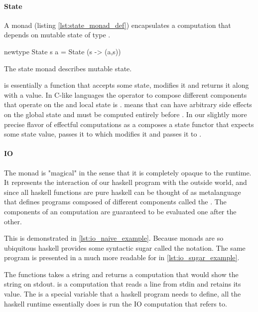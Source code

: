 \paragraph{State}

A  monad (listing \ref{lst:state_monad_def}) encapsulates
a computation that depends on mutable state of type .

\begin{code}
\begin{haskellcode}
newtype State s a = State (s -> (a,s))
\end{haskellcode}

  \caption{\label{lst:state_monad_def}The state monad describes
    mutable state.}
\end{code}

 is essentially a function that accepts some state, modifies it
and returns it along with a value. In C-like languages the operator to
compose different components that operate on the and local state is
\cpp{;}.  means that  can have arbitrary side effects on
the global state and must be computed entirely before . In our
slightly more precise flavor of effectful computations  as a
 composes a state functor that expects some state value, passes
it to  which modifies it and passes it to .

\paragraph{IO}

The  monad is "magical" in the sense that it is completely
opaque to the runtime. It represents the interaction of our haskell
program with the outside world, and since all haskell functions are
pure haskell can be thought of as metalanguage that defines programs
composed of different  components called the . The components of an  computation are guaranteed to
be evaluated one after the other.

This is demonstrated in \ref{lst:io_naive_example}. Because monads are so
ubiquitous haskell provides some syntactic sugar called the 
notation. The same program is presented in a much more readable for in
\ref{lst:io_sugar_example}.

The functions  takes a string and returns
a computation that would show the string on stdout.  is a computation that reads a line from stdin and retains its
value. The  is a special variable that a haskell
program needs to define, all the haskell runtime essentially does is
run the IO computation that  refers to.

